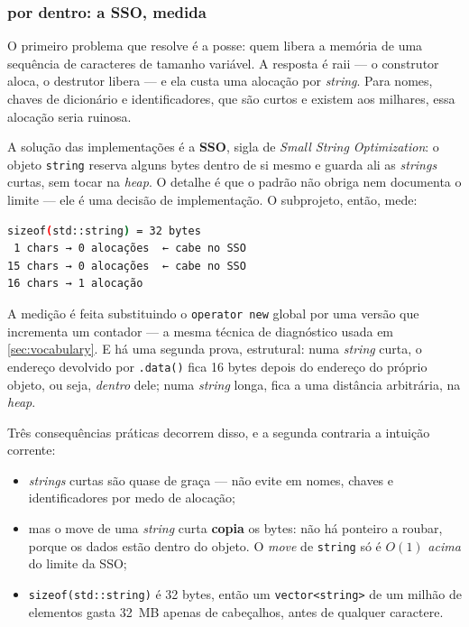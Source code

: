 \subsubsection{ por dentro: a SSO, medida}

O primeiro problema que  resolve é a posse: quem libera a
memória de uma sequência de caracteres de tamanho variável. A resposta é
\gls{raii} --- o construtor aloca, o destrutor libera --- e ela custa uma
alocação por \emph{string}. Para nomes, chaves de dicionário e identificadores,
que são curtos e existem aos milhares, essa alocação seria ruinosa.

A solução das implementações é a \textbf{SSO}, sigla de \emph{Small String
Optimization}: o objeto \texttt{string} reserva alguns bytes dentro de si mesmo
e guarda ali as \emph{strings} curtas, sem tocar na \emph{heap}. O detalhe é que
o padrão não obriga nem documenta o limite --- ele é uma decisão de
implementação. O subprojeto, então, mede:

\begin{lstlisting}[style=bt, language=bash,
    caption={Saída de \texttt{src/strings/}: o limite da SSO na libstdc++.}]
sizeof(std::string) = 32 bytes
 1 chars → 0 alocações  ← cabe no SSO
15 chars → 0 alocações  ← cabe no SSO
16 chars → 1 alocação
\end{lstlisting}

A medição é feita substituindo o \texttt{operator new} global por uma versão que
incrementa um contador --- a mesma técnica de diagnóstico usada em
\cref{sec:vocabulary}. E há uma segunda prova, estrutural: numa \emph{string}
curta, o endereço devolvido por \texttt{.data()} fica 16 bytes depois do
endereço do próprio objeto, ou seja, \emph{dentro} dele; numa \emph{string}
longa, fica a uma distância arbitrária, na \emph{heap}.

Três consequências práticas decorrem disso, e a segunda contraria a intuição
corrente:

\begin{itemize}
\item \emph{strings} curtas são quase de graça --- não evite 
      em nomes, chaves e identificadores por medo de alocação;
\item mas o \gls{move} de uma \emph{string} curta \textbf{copia} os bytes: não há
      ponteiro a roubar, porque os dados estão dentro do objeto. O \emph{move} de
      \texttt{string} só é $O(1)$ \emph{acima} do limite da SSO;
\item \texttt{sizeof(std::string)} é 32 bytes, então um
      \texttt{vector<string>} de um milhão de elementos gasta 32~MB apenas de
      cabeçalhos, antes de qualquer caractere.
\end{itemize}

